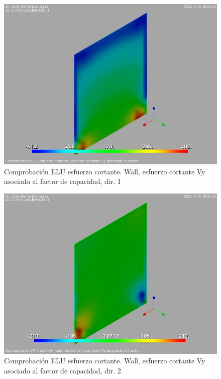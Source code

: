\begin{figure}[ht]
\begin{center}
\includegraphics[width=\linewidth]{results/graphics/shearULS/wallVySect1}
\caption{Comprobación ELU esfuerzo cortante. Wall, esfuerzo cortante Vy asociado al factor de capacidad, dir. 1}
\label{ULS_shearResistancewallVySect1}
\end{center}
\end{figure}
\begin{figure}[ht]
\begin{center}
\includegraphics[width=\linewidth]{results/graphics/shearULS/wallVySect2}
\caption{Comprobación ELU esfuerzo cortante. Wall, esfuerzo cortante Vy asociado al factor de capacidad, dir. 2}
\label{ULS_shearResistancewallVySect2}
\end{center}
\end{figure}
